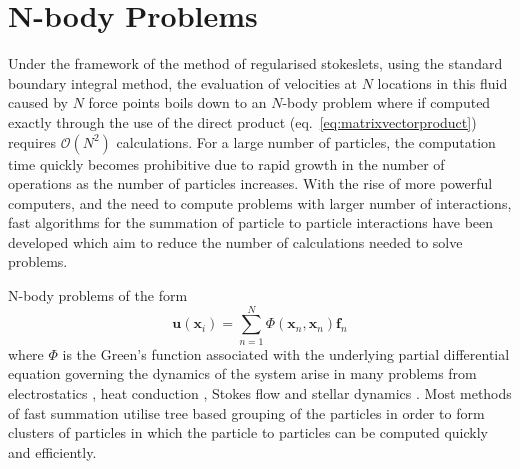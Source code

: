 \FloatBarrier
\section{N-body Problems} \label{sec:Nbody}

Under the framework of the method of regularised stokeslets, using the standard boundary integral method, the evaluation of velocities at $N$ locations in this fluid caused by $N$ force points boils down to an $N$-body problem where if computed exactly through the use of the direct product (eq.~\ref{eq:matrixvectorproduct}) requires $\mathcal{O}(N^2)$ calculations. For a large number of particles, the computation time quickly becomes prohibitive due to rapid growth in the number of operations as the number of particles increases. With the rise of more powerful computers, and the need to compute problems with larger number of interactions, fast algorithms for the summation of particle to particle interactions have been developed which aim to reduce the number of calculations needed to solve problems. 

N-body problems of the form
\begin{equation*}
    \bm{u}(\bm{x}_i) = \sum_{n=1}^N \Phi(\bm{x}_n,{\bm{x}}_n){\bm{f}}_n
\end{equation*}
where $\Phi$ is the Green's function associated with the underlying partial differential equation governing the dynamics of the system arise in many problems from electrostatics \cite{Beatson,Tornberg2008}, heat conduction \cite{Greengard1990APotentials}, Stokes flow \cite{Cortez2015,Tornberg2008} and stellar dynamics \cite{Dehnen2014ADynamics}. Most methods of fast summation utilise tree based grouping of the particles in order to form clusters of particles in which the particle to particles can be computed quickly and efficiently. 

